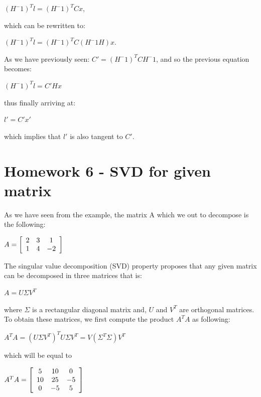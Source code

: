 \documentclass[]{article}
\begin{document}
\centerline {
	$(H^-1)^Tl = (H^-1)^TCx$,
}

\vspace{0.5em}

which can be rewritten to:

\vspace{0.5em}

\centerline {	
	$(H^-1)^Tl = (H^-1)^TC(H^-1H)x$.
}

\vspace{0.5em}

As we have previously seen: $C' = (H^-1)^TCH^-1$, and so the previous equation becomes:

\centerline {
	$(H^-1)^Tl = C'Hx$
}

\vspace{0.5em}

thus finally arriving at:

\vspace{0.5em}

\centerline {
	$l' = C'x'$
}

which implies that $l'$ is also tangent to $C'$.

\section{Homework 6 - SVD for given matrix}
As we have seen from the example, the matrix A which we out to decompose is the following: 

\centerline{ $A = \left[ {\begin{array}{*{20}c}
		2 & 3 & 1 \\
		1 & 4 & -2   
		\end{array} } \right]$ }
	
The singular value decomposition (SVD) property proposes that any given matrix can be decomposed in three matrices that is:

\centerline { $A = U \Sigma V^T$}

where $\Sigma$ is a rectangular diagonal matrix and, $U$ and $V^T$ are orthogonal matrices. To obtain these matrices, we first compute the product $A^TA$ as following:

\centerline {
	$A^TA = (U \Sigma V^T)^T U \Sigma V^T = V (\Sigma^T \Sigma)V^T $ 
}
which will be equal to 

\centerline{ $A^TA = \left[ {\begin{array}{*{20}c}
		5 & 10 & 0 \\
		10 & 25 & -5 \\ 
		0 & -5 & 5   
		\end{array} } \right]$ }
	
\end{document}
